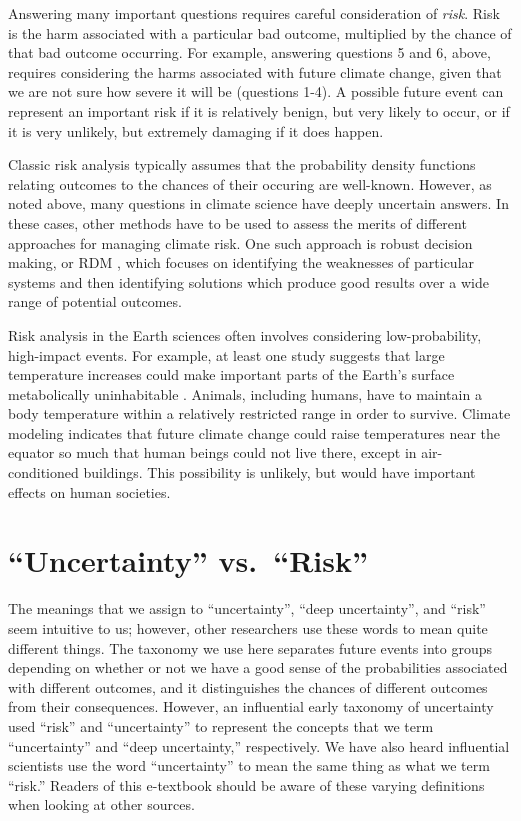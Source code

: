 \documentclass[
  11pt,
]{book}
\begin{document}
Answering many important questions requires careful consideration of \emph{risk}. Risk is the harm associated with a particular bad outcome, multiplied by the chance of that bad outcome occurring. For example, answering questions 5 and 6, above, requires considering the harms associated with future climate change, given that we are not sure how severe it will be (questions 1-4). A possible future event can represent an important risk if it is relatively benign, but very likely to occur, or if it is very unlikely, but extremely damaging if it does happen.

Classic risk analysis typically assumes that the probability density functions relating outcomes to the chances of their occuring are well-known. However, as noted above, many questions in climate science have deeply uncertain answers. In these cases, other methods have to be used to assess the merits of different approaches for managing climate risk. One such approach is robust decision making, or RDM \citep{Sriver2017-cc, Hadka2015-mx}, which focuses on identifying the weaknesses of particular systems and then identifying solutions which produce good results over a wide range of potential outcomes.

Risk analysis in the Earth sciences often involves considering low-probability, high-impact events. For example, at least one study suggests that large temperature increases could make important parts of the Earth's surface metabolically uninhabitable \citep{sherwoodAdaptabilityLimitClimate2010}. Animals, including humans, have to maintain a body temperature within a relatively restricted range in order to survive. Climate modeling indicates that future climate change could raise temperatures near the equator so much that human beings could not live there, except in air-conditioned buildings. This possibility is unlikely, but would have important effects on human societies.

\hypertarget{uncertainty-vs.-risk}{%
\section{\texorpdfstring{\enquote{Uncertainty} vs.~\enquote{Risk}}{``Uncertainty'' vs.~``Risk''}}\label{uncertainty-vs.-risk}}

The meanings that we assign to \enquote{uncertainty}, \enquote{deep uncertainty}, and \enquote{risk} seem intuitive to us; however, other researchers use these words to mean quite different things. The taxonomy we use here separates future events into groups depending on whether or not we have a good sense of the probabilities associated with different outcomes, and it distinguishes the chances of different outcomes from their consequences. However, an influential early taxonomy of uncertainty \citep{Knight1921-wq} used \enquote{risk} and \enquote{uncertainty} to represent the concepts that we term \enquote{uncertainty} and \enquote{deep uncertainty,} respectively. We have also heard influential scientists use the word \enquote{uncertainty} to mean the same thing as what we term \enquote{risk.} Readers of this e-textbook should be aware of these varying definitions when looking at other sources.
\end{document}
